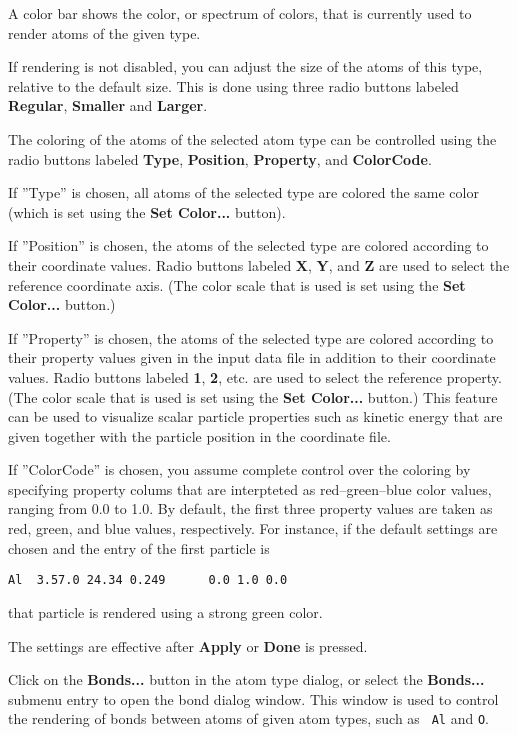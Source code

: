 \documentclass[11pt]{article}
\begin{document}
A color bar shows the color, or spectrum of colors, that is currently used 
to render atoms of the given type.

If rendering is not disabled, you can adjust the size of the atoms of this 
type, relative to the default size.  This is done using three radio buttons
labeled {\bf Regular}, {\bf Smaller} and {\bf Larger}.

The coloring of the atoms of the selected atom type can be controlled using the
radio buttons labeled {\bf Type}, {\bf Position}, {\bf Property}, and 
{\bf ColorCode}. 

If ''Type'' is chosen, all atoms of the selected type are colored the 
same color (which is set using the {\bf Set Color...} button). 

If ''Position'' is chosen, the atoms of the selected type are colored according
to their coordinate values.  Radio buttons labeled {\bf X}, {\bf Y}, and {\bf
Z} are used to select the reference coordinate axis.  (The color scale that is
used is set using the {\bf Set Color...} button.)

If ''Property'' is chosen, the atoms of the selected type are colored according
to their property values given in the input data file in addition to their
coordinate values.  Radio buttons labeled {\bf 1}, {\bf 2}, etc.  are used to
select the reference property.  (The color scale that is used is set using the
{\bf Set Color...} button.)  This feature can be used to visualize scalar 
particle properties such as kinetic energy that are given together with the 
particle position in the coordinate file.

If ''ColorCode'' is chosen, you assume complete control over the coloring 
by specifying property colums that are interpteted as red--green--blue color 
values, ranging from 0.0 to 1.0.  By default, the first three property 
values are taken as red, green, and blue values, respectively.   For instance, 
if the default settings are chosen and the entry of the first particle is
\begin{verbatim}
Al  3.57.0 24.34 0.249		0.0	1.0	0.0
\end{verbatim}
that particle is rendered using a strong green color.

The settings are effective after {\bf Apply} or {\bf Done} is pressed.

Click on the {\bf Bonds...} button in the atom type dialog, or select the {\bf
Bonds...} submenu entry to open the bond dialog window.  This window is used to
control the rendering of bonds between atoms of given atom types, such as {\tt
Al} and {\tt O}.  
\end{document}

